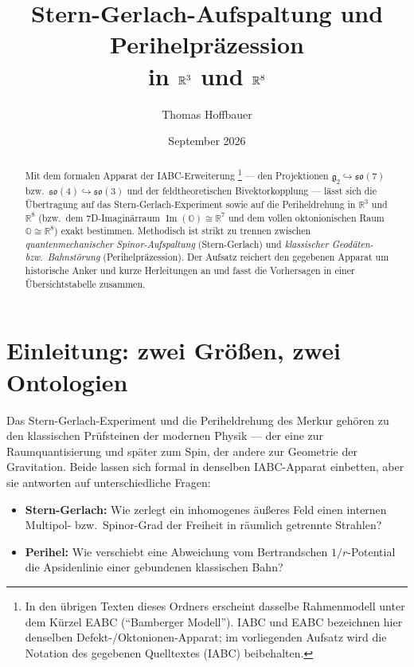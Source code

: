 \documentclass[11pt,a4paper]{article}
\title{\textbf{Stern-Gerlach-Aufspaltung und Perihelpräzession}\\[0.3em]
\large in \(\R^3\) und \(\R^8\)}
\author{Thomas Hoffbauer}
\date{September 2026}
\theoremstyle{definition}
\theoremstyle{remark}
\newcommand{\so}{\mathfrak{so}}
\newcommand{\gtwo}{\mathfrak{g}_2}
\newcommand{\ImO}{\operatorname{Im}}
\newcommand{\R}{\mathbb{R}}
\newcommand{\OO}{\mathbb{O}}
\begin{document}
\maketitle

\begin{abstract}
\noindent
Mit dem formalen Apparat der IABC-Erweiterung%
\footnote{In den übrigen Texten dieses Ordners erscheint dasselbe Rahmenmodell unter dem Kürzel
EABC (``Bamberger Modell''). IABC und EABC bezeichnen hier denselben Defekt-/Oktonionen-Apparat;
im vorliegenden Aufsatz wird die Notation des gegebenen Quelltextes (IABC) beibehalten.}
--- den Projektionen \(\gtwo\hookrightarrow\so(7)\) bzw.\ \(\so(4)\hookrightarrow\so(3)\) und der
feldtheoretischen Bivektorkopplung --- lässt sich die Übertragung auf das Stern-Gerlach-Experiment
sowie auf die Periheldrehung in \(\R^3\) und \(\R^8\) (bzw.\ dem 7D-Imaginärraum
\(\ImO(\OO)\cong\R^7\) und dem vollen oktonionischen Raum \(\OO\cong\R^8\)) exakt bestimmen.
Methodisch ist strikt zu trennen zwischen \emph{quantenmechanischer Spinor-Aufspaltung}
(Stern-Gerlach) und \emph{klassischer Geodäten- bzw.\ Bahnstörung} (Perihelpräzession).
Der Aufsatz reichert den gegebenen Apparat um historische Anker und kurze Herleitungen an und
fasst die Vorhersagen in einer Übersichtstabelle zusammen.
\end{abstract}

\tableofcontents
\vspace{1em}

\section{Einleitung: zwei Größen, zwei Ontologien}

Das Stern-Gerlach-Experiment und die Periheldrehung des Merkur gehören zu den klassischen
Prüfsteinen der modernen Physik --- der eine zur Raumquantisierung und später zum Spin,
der andere zur Geometrie der Gravitation. Beide lassen sich formal in denselben IABC-Apparat
einbetten, aber sie antworten auf unterschiedliche Fragen:

\begin{itemize}
  \item \textbf{Stern-Gerlach:} Wie zerlegt ein inhomogenes äußeres Feld einen internen
        Multipol- bzw.\ Spinor-Grad der Freiheit in räumlich getrennte Strahlen?
  \item \textbf{Perihel:} Wie verschiebt eine Abweichung vom Bertrandschen \(1/r\)-Potential
        die Apsidenlinie einer gebundenen klassischen Bahn?
\end{itemize}
\end{document}
